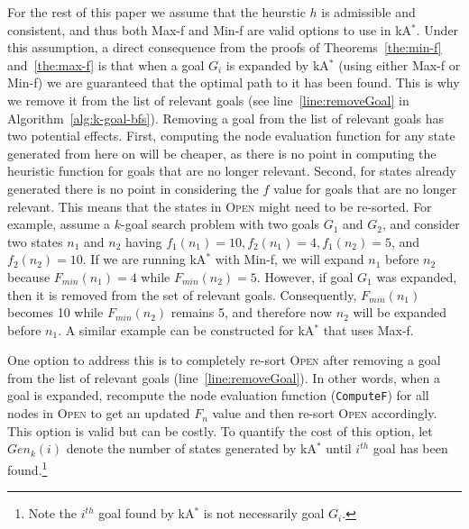 \documentclass{aicom2e}
\newcommand{\kgs}{$k$-goal search}
\newcommand{\kastar}{kA$^*$}
\newcommand{\minf}{Min-f}
\newcommand{\maxf}{Max-f}
\newcommand{\open}{\textsc{Open}}
\begin{document}
For the rest of this paper we assume that the heurstic $h$ is admissible and consistent, and thus both \maxf{} and \minf{} are valid options to use in \kastar{}. Under this assumption, a direct consequence from the proofs of Theorems~\ref{the:min-f} and~\ref{the:max-f} is that when a goal $G_i$ is expanded by \kastar{} (using either \maxf{} or \minf{}) we are guaranteed that the optimal path to it has been found. This is why we remove it from the list of relevant goals (see line~\ref{line:removeGoal} in Algorithm~\ref{alg:k-goal-bfs}). Removing a goal from the list of relevant goals has two potential effects. First, computing the node evaluation function for any state generated from here on will be cheaper, as there is no point in computing the heuristic function for goals that are no longer relevant. Second, for states already generated there is no point in considering the $f$ value for goals that are no longer relevant. This means that the states in \open{} might need to be re-sorted. For example, assume a \kgs{} problem with two goals $G_1$ and $G_2$, and consider two states $n_1$ and $n_2$ having $f_1(n_1)=10, f_2(n_1)=4, f_1(n_2)=5$, and $f_2(n_2)=10$. If we are running \kastar{} with \minf{}, we will expand $n_1$ before $n_2$ because $F_{min}(n_1)=4$ while $F_{min}(n_2)=5$. However, if goal $G_1$ was expanded, then it is removed from the set of relevant goals. Consequently, $F_{min}(n_1)$ becomes 10 while $F_{min}(n_2)$ remains 5, and therefore now $n_2$ will be expanded before $n_1$. A similar example can be constructed for \kastar{} that uses \maxf{}.



One option to address this is to completely re-sort \open{} after removing a goal from the list of relevant goals (line~\ref{line:removeGoal}). 
In other words, when a goal is expanded, recompute the node evaluation function ({\tt ComputeF}) for all nodes in \open{} to get an updated $F_n$ value and then  re-sort \open{} accordingly. 
This option is valid but can be costly. To quantify the cost of this option, 
let $Gen_k(i)$ denote the number of states generated by \kastar{} until $i^{th}$ goal has been found.\footnote{Note the $i^{th}$ goal found by \kastar{} is not necessarily goal $G_i$.} 

\end{document}
